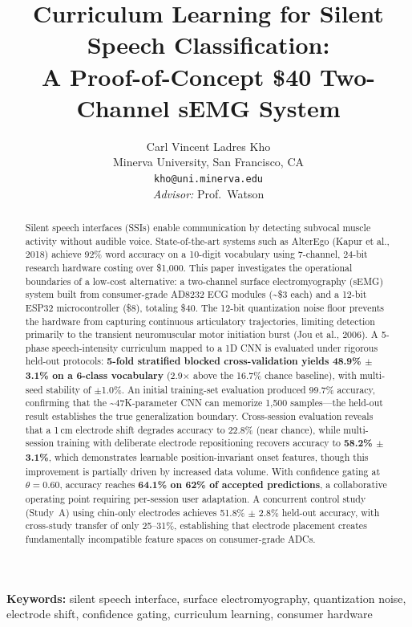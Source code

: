 \documentclass[11pt, a4paper]{article}
\title{Curriculum Learning for Silent Speech Classification:\\ A Proof-of-Concept \$40 Two-Channel sEMG System}
\author{Carl Vincent Ladres Kho\\
Minerva University, San Francisco, CA\\
\texttt{kho@uni.minerva.edu}\\[0.5em]
\textit{Advisor:} Prof.\ Watson}
\date{}
\begin{document}
\maketitle

\begin{abstract}
Silent speech interfaces (SSIs) enable communication by detecting subvocal muscle activity without audible voice. State-of-the-art systems such as AlterEgo (Kapur et al., 2018) achieve 92\% word accuracy on a 10-digit vocabulary using 7-channel, 24-bit research hardware costing over \$1{,}000. This paper investigates the operational boundaries of a low-cost alternative: a two-channel surface electromyography (sEMG) system built from consumer-grade AD8232 ECG modules (\textasciitilde\$3 each) and a 12-bit ESP32 microcontroller (\$8), totaling \$40. The 12-bit quantization noise floor prevents the hardware from capturing continuous articulatory trajectories, limiting detection primarily to the transient neuromuscular motor initiation burst (Jou et al., 2006). A 5-phase speech-intensity curriculum mapped to a 1D CNN is evaluated under rigorous held-out protocols: \textbf{5-fold stratified blocked cross-validation yields 48.9\% $\pm$ 3.1\% on a 6-class vocabulary} (2.9$\times$ above the 16.7\% chance baseline), with multi-seed stability of $\pm$1.0\%. An initial training-set evaluation produced 99.7\% accuracy, confirming that the \textasciitilde47K-parameter CNN can memorize 1,500 samples---the held-out result establishes the true generalization boundary. Cross-session evaluation reveals that a 1\,cm electrode shift degrades accuracy to 22.8\% (near chance), while multi-session training with deliberate electrode repositioning recovers accuracy to \textbf{58.2\% $\pm$ 3.1\%}, which demonstrates learnable position-invariant onset features, though this improvement is partially driven by increased data volume. With confidence gating at $\theta = 0.60$, accuracy reaches \textbf{64.1\% on 62\% of accepted predictions}, a collaborative operating point requiring per-session user adaptation. A concurrent control study (Study~A) using chin-only electrodes achieves 51.8\% $\pm$ 2.8\% held-out accuracy, with cross-study transfer of only 25--31\%, establishing that electrode placement creates fundamentally incompatible feature spaces on consumer-grade ADCs.
\end{abstract}

\noindent\textbf{Keywords:} silent speech interface, surface electromyography, quantization noise, electrode shift, confidence gating, curriculum learning, consumer hardware
\end{document}
